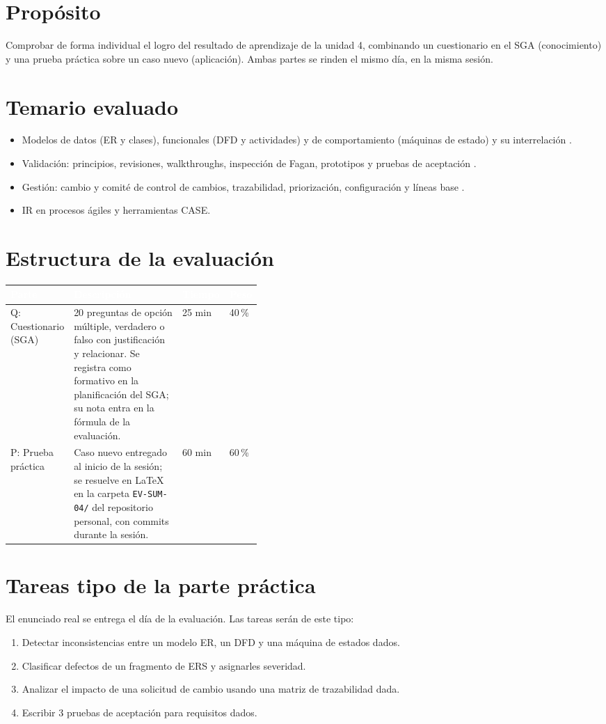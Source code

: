 \documentclass[11pt]{article}
\newcommand{\thdr}[1]{\cellcolor{utegreen}\textcolor{white}{\textbf{#1}}}
\newcommand{\seccion}[1]{\section{\textcolor{utegreendk}{#1}}}
\begin{document}
\seccion{Propósito}

Comprobar de forma individual el logro del resultado de aprendizaje de la unidad 4, combinando un cuestionario en el SGA (conocimiento) y una prueba práctica sobre un caso nuevo (aplicación). Ambas partes se rinden el mismo día, en la misma sesión.

\seccion{Temario evaluado}

\begin{itemize}[leftmargin=20pt,itemsep=2pt]
	\item Modelos de datos (ER y clases), funcionales (DFD y actividades) y de comportamiento (máquinas de estado) y su interrelación \citep{pohl_2025,omg_uml_2017}.
	\item Validación: principios, revisiones, walkthroughs, inspección de Fagan, prototipos y pruebas de aceptación \citep{fagan_1976}.
	\item Gestión: cambio y comité de control de cambios, trazabilidad, priorización, configuración y líneas base \citep{gotel_finkelstein_1994}.
	\item IR en procesos ágiles y herramientas CASE.
\end{itemize}

\seccion{Estructura de la evaluación}

\noindent\begin{tabularx}{\linewidth}{|L{0.20\linewidth}|Y|C{0.12\linewidth}|C{0.10\linewidth}|}
	\hline
	\thdr{Parte} & \thdr{Descripción} & \thdr{Tiempo} & \thdr{Peso}\\
	\hline
	Q: Cuestionario (SGA) & 20 preguntas de opción múltiple, verdadero o falso con justificación y relacionar. Se registra como formativo en la planificación del SGA; su nota entra en la fórmula de la evaluación. & 25 min & 40\,\%\\
	\hline
	 P: Prueba práctica & Caso nuevo entregado al inicio de la sesión; se resuelve en \LaTeX{} en la carpeta \texttt{EV-SUM-04/} del repositorio personal, con commits durante la sesión. & 60 min & 60\,\%\\
	\hline
\end{tabularx}

\seccion{Tareas tipo de la parte práctica}

El enunciado real se entrega el día de la evaluación. Las tareas serán de este tipo:

\begin{enumerate}[leftmargin=20pt,itemsep=2pt]
	\item Detectar inconsistencias entre un modelo ER, un DFD y una máquina de estados dados.
	\item Clasificar defectos de un fragmento de ERS y asignarles severidad.
	\item Analizar el impacto de una solicitud de cambio usando una matriz de trazabilidad dada.
	\item Escribir 3 pruebas de aceptación para requisitos dados.
\end{enumerate}
\end{document}
